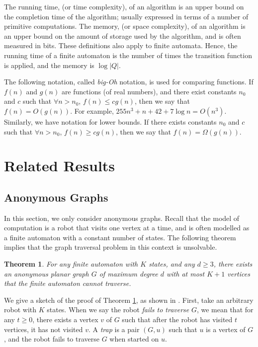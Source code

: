 \documentclass[12pt,letterpaper,oneside]{book}
\newtheorem{theorem}{Theorem}[section]
\begin{document}
The running time, (or time complexity), of an algorithm is an upper bound on the completion time of the 
algorithm; usually expressed in terms of a number of primitive computations.  The memory, 
(or space complexity), of an algorithm is an upper bound on the amount of storage used by the algorithm, and is often measured in bits.  
These definitions also apply to finite automata.  
Hence, the running time of a finite automaton is the number of times the transition function is applied, and the memory is $\log |Q|$.  

The following notation, called \emph{big-Oh} notation, 
is used for comparing functions.  
If $f(n)$ and $g(n)$ are functions (of real numbers), and there exist constants $n_0$ and $c$ 
such that $\forall n>n_0$, $f(n)\le c g(n)$, then we say that $f(n)=O(g(n))$.  
For example, $255n^3 + n + 42+7\log n = O(n^3)$.  Similarly, we have notation for lower bounds.  
If there exists constants $n_0$ and $c$ 
such that $\forall n>n_0$, $f(n)\ge c g(n)$, then we say that $f(n)=\Omega(g(n))$.  
\newpage
\section{Related Results}






\subsection{Anonymous Graphs}

In this section, we only consider anonymous graphs.  Recall that 
the model of computation is a robot 
that visits one vertex at a time, and is often modelled as a finite automaton with a constant number of states.  The following theorem implies 
that the graph traversal problem in this context is unsolvable.  


\begin{theorem}\label{it1}
\emph{\cite{FIPPP}} For any finite automaton with $K$ states, and any $d\ge 3$, there exists an anonymous planar graph $G$ of maximum degree $d$ with 
at most $K+1$ vertices that the finite automaton cannot traverse.  
\end{theorem}

We give a sketch of the proof of Theorem \ref{it1}, as shown in \cite{FIPPP}.  First, take an arbitrary 
robot with $K$ states.  When we say the robot \emph{fails to traverse} $G$, we mean that for any $t\ge 0$, there exists a vertex $v$ 
of $G$ such that after the robot has visited $t$ vertices, it has not visited $v$.  A \emph{trap} is a pair $(G,u)$ such that $u$ is a vertex 
of $G$, and the robot fails to traverse $G$ when started on $u$.  
\end{document}
